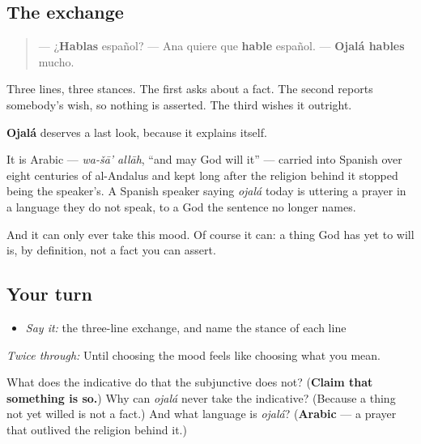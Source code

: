 \subsection*{The exchange}
\begin{quote}
— ¿\textbf{Hablas} español? — Ana quiere que \textbf{hable} español. — \textbf{Ojalá hables} mucho.
\end{quote}

Three lines, three stances. The first asks about a fact. The second reports somebody's wish, so nothing is asserted. The third wishes it outright.

\begin{grammarlens}[title={What you've built}]
\textbf{Ojalá} deserves a last look, because it explains itself.

It is Arabic — \emph{wa-šā' allāh}, \textquotedblleft{}and may God will it\textquotedblright{} — carried into Spanish over eight centuries of al-Andalus and kept long after the religion behind it stopped being the speaker's. A Spanish speaker saying \emph{ojalá} today is uttering a prayer in a language they do not speak, to a God the sentence no longer names.

And it can only ever take this mood. Of course it can: a thing God has yet to will is, by definition, not a fact you can assert.
\end{grammarlens}

\subsection*{Your turn}
\begin{itemize}
\raggedright
  \item \emph{Say it:} the three-line exchange, and name the stance of each line
\end{itemize}

\emph{Twice through:} Until choosing the mood feels like choosing what you mean.

\begin{tcolorbox}[breakable,colback=teal!4,colframe=teal!35!black,title={Before you move on}]
What does the indicative do that the subjunctive does not? (\textbf{Claim that something is so.}) Why can \emph{ojalá} never take the indicative? (Because a thing not yet willed is not a fact.) And what language is \emph{ojalá}? (\textbf{Arabic} — a prayer that outlived the religion behind it.)
\end{tcolorbox}
